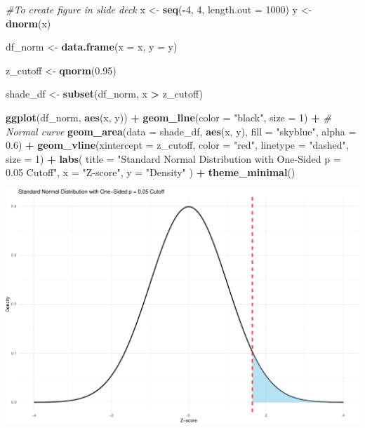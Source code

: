 \documentclass[
  12pt,
]{article}
\newenvironment{Shaded}{\begin{snugshade}}{\end{snugshade}}
\newcommand{\AttributeTok}[1]{\textcolor[rgb]{0.13,0.29,0.53}{#1}}
\newcommand{\CommentTok}[1]{\textcolor[rgb]{0.56,0.35,0.01}{\textit{#1}}}
\newcommand{\DecValTok}[1]{\textcolor[rgb]{0.00,0.00,0.81}{#1}}
\newcommand{\FloatTok}[1]{\textcolor[rgb]{0.00,0.00,0.81}{#1}}
\newcommand{\FunctionTok}[1]{\textcolor[rgb]{0.13,0.29,0.53}{\textbf{#1}}}
\newcommand{\NormalTok}[1]{#1}
\newcommand{\OtherTok}[1]{\textcolor[rgb]{0.56,0.35,0.01}{#1}}
\newcommand{\SpecialCharTok}[1]{\textcolor[rgb]{0.81,0.36,0.00}{\textbf{#1}}}
\newcommand{\StringTok}[1]{\textcolor[rgb]{0.31,0.60,0.02}{#1}}
\begin{document}
\begin{Shaded}
\begin{Highlighting}[]
\CommentTok{\#To create figure in slide deck}
\NormalTok{x }\OtherTok{\textless{}{-}} \FunctionTok{seq}\NormalTok{(}\SpecialCharTok{{-}}\DecValTok{4}\NormalTok{, }\DecValTok{4}\NormalTok{, }\AttributeTok{length.out =} \DecValTok{1000}\NormalTok{)}
\NormalTok{y }\OtherTok{\textless{}{-}} \FunctionTok{dnorm}\NormalTok{(x)}

\NormalTok{df\_norm }\OtherTok{\textless{}{-}} \FunctionTok{data.frame}\NormalTok{(}\AttributeTok{x =}\NormalTok{ x, }\AttributeTok{y =}\NormalTok{ y)}

\NormalTok{z\_cutoff }\OtherTok{\textless{}{-}} \FunctionTok{qnorm}\NormalTok{(}\FloatTok{0.95}\NormalTok{)  }

\NormalTok{shade\_df }\OtherTok{\textless{}{-}} \FunctionTok{subset}\NormalTok{(df\_norm, x }\SpecialCharTok{\textgreater{}}\NormalTok{ z\_cutoff)}


\FunctionTok{ggplot}\NormalTok{(df\_norm, }\FunctionTok{aes}\NormalTok{(x, y)) }\SpecialCharTok{+}
  \FunctionTok{geom\_line}\NormalTok{(}\AttributeTok{color =} \StringTok{"black"}\NormalTok{, }\AttributeTok{size =} \DecValTok{1}\NormalTok{) }\SpecialCharTok{+}  \CommentTok{\# Normal curve}
  \FunctionTok{geom\_area}\NormalTok{(}\AttributeTok{data =}\NormalTok{ shade\_df, }\FunctionTok{aes}\NormalTok{(x, y), }\AttributeTok{fill =} \StringTok{"skyblue"}\NormalTok{, }\AttributeTok{alpha =} \FloatTok{0.6}\NormalTok{) }\SpecialCharTok{+} 
  \FunctionTok{geom\_vline}\NormalTok{(}\AttributeTok{xintercept =}\NormalTok{ z\_cutoff, }\AttributeTok{color =} \StringTok{"red"}\NormalTok{, }\AttributeTok{linetype =} \StringTok{"dashed"}\NormalTok{, }\AttributeTok{size =} \DecValTok{1}\NormalTok{) }\SpecialCharTok{+}  
  \FunctionTok{labs}\NormalTok{(}
    \AttributeTok{title =} \StringTok{"Standard Normal Distribution with One{-}Sided p = 0.05 Cutoff"}\NormalTok{,}
    \AttributeTok{x =} \StringTok{"Z{-}score"}\NormalTok{,}
    \AttributeTok{y =} \StringTok{"Density"}
\NormalTok{  ) }\SpecialCharTok{+}
  \FunctionTok{theme\_minimal}\NormalTok{()}
\end{Highlighting}
\end{Shaded}

\includegraphics{Arkesh_Das_CMSE_410_Semester_Project_files/figure-latex/normal dist curve-1.pdf}
\end{document}
